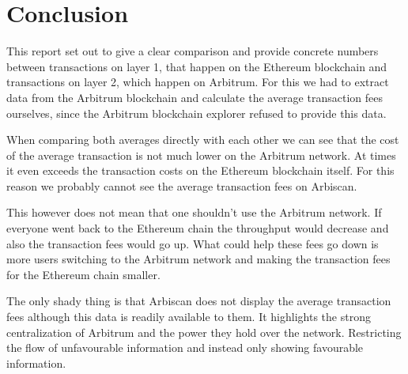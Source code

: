 \documentclass[a4paper,oneside,openright,11pt]{report}
\begin{document}
\chapter{Conclusion}
\label{ch:conclusion}

This report set out to give a clear comparison and provide concrete numbers 
between transactions on layer 1, that happen on the
Ethereum blockchain and transactions on layer 2, which happen on Arbitrum.
For this we had to extract data from the Arbitrum blockchain and calculate the 
average transaction fees ourselves, since the Arbitrum blockchain explorer refused to provide this data. 

When comparing both averages directly with each other we can see that the cost of the 
average transaction is not much lower on the Arbitrum network. 
At times it even exceeds the transaction costs on the Ethereum blockchain itself.
For this reason we probably cannot see the average transaction fees on Arbiscan.

This however does not mean that one shouldn't use the Arbitrum network.
If everyone went back to the Ethereum chain the throughput would decrease and
also the transaction fees would go up.
What could help these fees go down is more users switching to the Arbitrum network and
making the transaction fees for the Ethereum chain smaller.

The only shady thing is that Arbiscan does not display the average transaction fees although 
this data is readily available to them. It highlights the strong centralization of Arbitrum and the
power they hold over the network. Restricting the flow of unfavourable information and instead only
showing favourable information.





\end{document}
